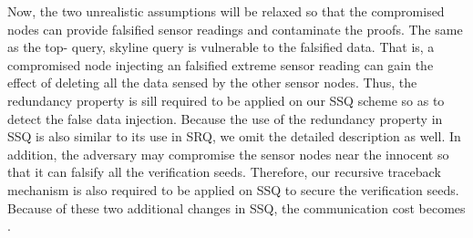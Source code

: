 \documentclass[conference]{IEEEtran}
\begin{document}
Now, the two unrealistic assumptions will be relaxed so that the compromised nodes can provide falsified sensor readings and contaminate the proofs. The same as the top- query, skyline query is vulnerable to the falsified data. That is, a compromised node injecting an falsified extreme sensor reading can gain the effect of deleting all the data sensed by the other sensor nodes. Thus, the redundancy property is sill required to be applied on our SSQ scheme so as to detect the false data injection. Because the use of the redundancy property in SSQ is also similar to its use in SRQ, we omit the detailed description as well. In addition, the adversary may compromise the sensor nodes near the innocent  so that it can falsify all the verification seeds. Therefore, our recursive traceback mechanism is also required to be applied on SSQ to secure the verification seeds. Because of these two additional changes in SSQ, the communication cost becomes .
\end{document}
